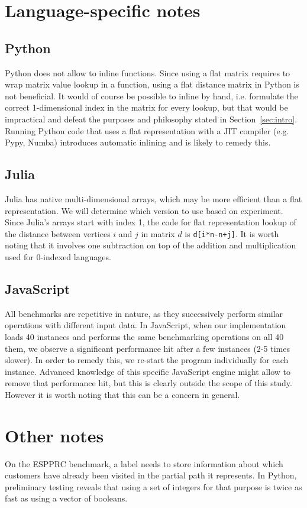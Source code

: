 \documentclass[11pt,a4paper,notitlepage]{article}
\begin{document}
\section{Language-specific notes}
\subsection{Python}
Python does not allow to inline functions. Since using a flat matrix
requires to wrap matrix value lookup in a function, using a flat distance
matrix in Python is not beneficial. It would of course be possible to
inline by hand, i.e. formulate the correct 1-dimensional index in the
matrix for every lookup, but that would be impractical and defeat the
purposes and philosophy stated in Section~\ref{sec:intro}.
Running Python code that uses a flat representation with a JIT compiler
(e.g. Pypy, Numba) introduces automatic inlining and is likely to
remedy this.
\subsection{Julia}
Julia has native multi-dimensional arrays, which may be more efficient
than a flat representation. We will determine which version to use
based on experiment. Since Julia's arrays start with index 1, the code
for flat representation lookup of the distance between vertices $i$
and $j$ in matrix $d$ is \lstinline{d[i*n-n+j]}. It is worth noting
that it involves one subtraction on top of the addition and
multiplication used for 0-indexed languages.
\subsection{JavaScript}
All benchmarks are repetitive in nature, as they successively perform similar
operations with different input data. In JavaScript, when our
implementation loads 40 instances and performs the same
benchmarking operations on all 40 them, we observe a significant performance
hit after a few instances (2-5 times slower). In order to remedy this,
we re-start the program individually for each instance. Advanced
knowledge of this specific JavaScript engine might allow to remove that
performance hit, but this is clearly outside the scope of this
study. However it is worth noting that this can be a concern in general.

\section{Other notes}
On the ESPPRC benchmark, a label needs to store information about
which customers have already been visited in the partial path it
represents. In Python, preliminary testing reveals that using a set of
integers for that purpose is twice as fast as using a vector of booleans.



\end{document}

